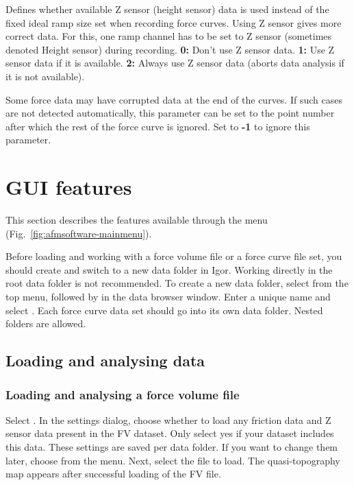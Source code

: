\documentclass[12pt,a4paper]{article}
\begin{document}
\begin{description}[style=nextline]
\item[ksXDataZSens]
Defines whether available Z sensor (height sensor) data is used instead of the fixed ideal ramp size set when recording force curves. Using Z sensor gives more correct data. For this, one ramp channel has to be set to Z sensor (sometimes denoted Height sensor) during recording. \textbf{0:} Don't use Z sensor data. \textbf{1:} Use Z sensor data if it is available. \textbf{2:} Always use Z sensor data (aborts data analysis if it is not available).

\item[ksMaxGoodPt]
Some force data may have corrupted data at the end of the curves. If such cases are not detected automatically, this parameter can be set to the point number after which the rest of the force curve is ignored. Set to \textbf{-1} to ignore this parameter.

\end{description}


\section{GUI features}
\label{sec:afmsoftware-gui}

This section describes the features available through the  menu (Fig.~\ref{fig:afmsoftware-mainmenu}).

Before loading and working with a force volume file or a force curve file set, you should create and switch to a new data folder in Igor. Working directly in the root data folder is not recommended. To create a new data folder, select  from the top menu, followed by  in the data browser window.
Enter a unique name and select . Each force curve data set should go into its own data folder. Nested folders are allowed.

\subsection{Loading and analysing data}

\subsubsection{Loading and analysing a force volume file}
Select . In the settings dialog, choose whether to load any friction data and Z sensor data present in the FV dataset. Only select yes if your dataset includes this data.
These settings are saved per data folder. If you want to change them later, choose  from the menu.
Next, select the file to load. The quasi-topography map appears after successful loading of the FV file.
\end{document}

